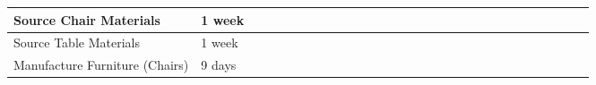 \begin{table}[!h]
{\begin{tabular}{|l|l|l|l|l|l|l|l|l|l|l|l|l|l|l|l|l|l|l|l|l|l|l|l|l|l|l|l|l|}
            Source Chair Materials           & 1 week  &                          &                          &                          &                          &                          &                          &                          &                          &                          &                          &                          &                          &                          &                          &                          & \cellcolor[HTML]{FD6864} & \cellcolor[HTML]{FD6864} &                          &                          &                          &                          &                          &                          &                          &                          &                          &                          \\ \hline
            Source Table Materials           & 1 week  &                          &                          &                          &                          &                          &                          &                          &                          &                          &                          &                          &                          &                          &                          &                          & \cellcolor[HTML]{FD6864} & \cellcolor[HTML]{FD6864} &                          &                          &                          &                          &                          &                          &                          &                          &                          &                          \\ \hline
            Manufacture Furniture (Chairs)   & 9 days  &                          &                          &                          &                          &                          &                          &                          &                          &                          &                          &                          &                          &                          &                          &                          &                          &                          & \cellcolor[HTML]{FD6864} & \cellcolor[HTML]{FD6864} &                          &                          &                          &                          &                          &                          &                          &                          \\ \hline

\end{tabular}}
\end{table}
